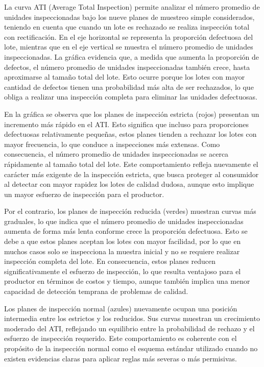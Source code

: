 \documentclass[
  12pt,
]{article}
\begin{document}
La curva ATI (Average Total Inspection) permite analizar el número
promedio de unidades inspeccionadas bajo los nueve planes de muestreo
simple considerados, teniendo en cuenta que cuando un lote es rechazado
se realiza inspección total con rectificación. En el eje horizontal se
representa la proporción defectuosa del lote, mientras que en el eje
vertical se muestra el número promedio de unidades inspeccionadas. La
gráfica evidencia que, a medida que aumenta la proporción de defectos,
el número promedio de unidades inspeccionadas también crece, hasta
aproximarse al tamaño total del lote. Esto ocurre porque los lotes con
mayor cantidad de defectos tienen una probabilidad más alta de ser
rechazados, lo que obliga a realizar una inspección completa para
eliminar las unidades defectuosas.

En la gráfica se observa que los planes de inspección estricta (rojos)
presentan un incremento más rápido en el ATI. Esto significa que incluso
para proporciones defectuosas relativamente pequeñas, estos planes
tienden a rechazar los lotes con mayor frecuencia, lo que conduce a
inspecciones más extensas. Como consecuencia, el número promedio de
unidades inspeccionadas se acerca rápidamente al tamaño total del lote.
Este comportamiento refleja nuevamente el carácter más exigente de la
inspección estricta, que busca proteger al consumidor al detectar con
mayor rapidez los lotes de calidad dudosa, aunque esto implique un mayor
esfuerzo de inspección para el productor.

Por el contrario, los planes de inspección reducida (verdes) muestran
curvas más graduales, lo que indica que el número promedio de unidades
inspeccionadas aumenta de forma más lenta conforme crece la proporción
defectuosa. Esto se debe a que estos planes aceptan los lotes con mayor
facilidad, por lo que en muchos casos solo se inspecciona la muestra
inicial y no se requiere realizar inspección completa del lote. En
consecuencia, estos planes reducen significativamente el esfuerzo de
inspección, lo que resulta ventajoso para el productor en términos de
costos y tiempo, aunque también implica una menor capacidad de detección
temprana de problemas de calidad.

Los planes de inspección normal (azules) nuevamente ocupan una posición
intermedia entre los estrictos y los reducidos. Sus curvas muestran un
crecimiento moderado del ATI, reflejando un equilibrio entre la
probabilidad de rechazo y el esfuerzo de inspección requerido. Este
comportamiento es coherente con el propósito de la inspección normal
como el esquema estándar utilizado cuando no existen evidencias claras
para aplicar reglas más severas o más permisivas.
\end{document}
